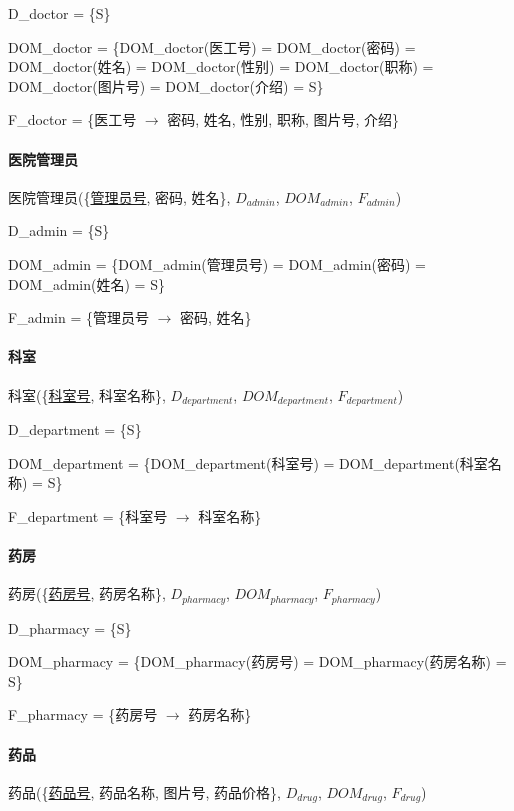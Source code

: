 \documentclass{article}
\begin{document}
D\_doctor = \{S\}

DOM\_doctor = \{DOM\_doctor(医工号) = DOM\_doctor(密码) = DOM\_doctor(姓名) = \newline DOM\_doctor(性别) = DOM\_doctor(职称) = DOM\_doctor(图片号) = DOM\_doctor(介绍) = S\}

F\_doctor = \{医工号 $\rightarrow$ 密码, 姓名, 性别, 职称, 图片号, 介绍\}

\paragraph{医院管理员}

医院管理员(\{\underline{管理员号}, 密码, 姓名\}, $D_{admin}$, $DOM_{admin}$, $F_{admin}$)

D\_admin = \{S\}

DOM\_admin = \{DOM\_admin(管理员号) = DOM\_admin(密码) = DOM\_admin(姓名) = S\}

F\_admin = \{管理员号 $\rightarrow$ 密码, 姓名\}

\paragraph{科室}

科室(\{\underline{科室号}, 科室名称\}, $D_{department}$, $DOM_{department}$, $F_{department}$)

D\_department = \{S\}

DOM\_department = \{DOM\_department(科室号) = DOM\_department(科室名称) = S\}

F\_department = \{科室号 $\rightarrow$ 科室名称\}

\paragraph{药房}

药房(\{\underline{药房号}, 药房名称\}, $D_{pharmacy}$, $DOM_{pharmacy}$, $F_{pharmacy}$)

D\_pharmacy = \{S\}

DOM\_pharmacy = \{DOM\_pharmacy(药房号) = DOM\_pharmacy(药房名称) = S\}

F\_pharmacy = \{药房号 $\rightarrow$ 药房名称\}

\paragraph{药品}

药品(\{\underline{药品号}, 药品名称, 图片号, 药品价格\}, $D_{drug}$, $DOM_{drug}$, $F_{drug}$)
\end{document}
